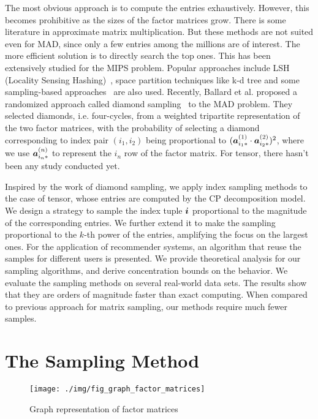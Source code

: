 \documentclass[letterpaper]{article}
\newcommand{\V}[1]{{\boldsymbol{{\MakeLowercase{#1}}}}}
\newcommand{\RowVecA}[1]{\V{a}^{(#1)}_{i_#1*}}
\begin{document}
The most obvious approach is to compute the entries exhaustively.
However, this becomes prohibitive as the sizes of the factor matrices grow.
There is some literature in approximate matrix multiplication.
But these methods are not suited even for MAD,
since only a few entries among the millions are of interest.
The more efficient solution is to directly search the top ones.
This has been extensively studied for the MIPS problem.
Popular approaches include LSH (Locality Sensing Hashing)~\cite{Andoni08,ALSH14},
space partition techniques like k-d tree
and some sampling-based approaches~\cite{Drineas2006,John15} are also used.
Recently, Ballard et al. proposed a randomized approach called diamond sampling~\cite{BaPiKoSe15} to the MAD problem.
They selected diamonds, i.e. four-cycles, from a weighted tripartite representation of the two factor matrices,
with the probability of selecting a diamond corresponding to index pair $(i_1,i_2)$
being proportional to $(\RowVecA{1}\cdot\RowVecA{2})^2$,
where we use $\RowVecA{n}$ to represent the $i_n$ row of the factor matrix.
For tensor, there hasn't been any study conducted yet.

Inspired by the work of diamond sampling,
we apply index sampling methods to the case of tensor,
whose entries are computed by the CP decomposition model.
We design a strategy to sample the index tuple $\V{i}$ proportional to the magnitude of the corresponding entries.
We further extend it to make the sampling proportional to the $k$-th power of the entries,
amplifying the focus on the largest ones.
For the application of recommender systems,
an algorithm that reuse the samples for different users is presented.
We provide theoretical analysis for our sampling algorithms,
and derive concentration bounds on the behavior.
We evaluate the sampling methods on several real-world data sets.
The results show that they are orders of magnitude faster than exact computing.
When compared to previous approach for matrix sampling, our methods require much fewer samples.

\section{The Sampling Method}
\begin{figure}[!ht]
  \centering
  \texttt{[image: ./img/fig\_graph\_factor\_matrices]}\\
  \caption{Graph representation of factor matrices}
  \label{fig:GraphMatrices}
\end{figure}
\end{document}
